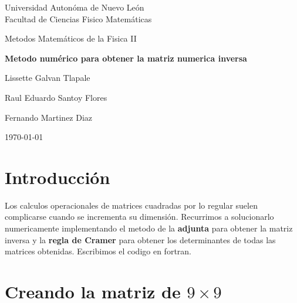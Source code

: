 \documentclass[a4paper]{scrartcl}
\begin{document}
\begin{center}
    \huge{Universidad Autonóma de Nuevo León} \\
    \LARGE{Facultad de Ciencias Fisico Matemáticas}
\end{center}

\vspace{1 cm}
\begin{center}
    \Large{Metodos Matemáticos de la Fisica II}
\end{center}

\vspace{0.5cm}
\begin{center}
    \LARGE\textbf{Metodo numérico para obtener la matriz numerica inversa}\\
\end{center}

\vspace{1.5cm}
\begin{center}
    \large Lissette Galvan Tlapale 
\end{center}
\begin{center}
    \large Raul Eduardo Santoy Flores 
\end{center}
\begin{center}
    \large Fernando Martinez Diaz
\end{center}

\vspace{6cm}
\begin{center}
    \today
\end{center}

\newpage
\section{Introducción}

Los calculos operacionales de matrices cuadradas por lo regular suelen complicarse cuando se incrementa su dimensión. Recurrimos a solucionarlo numericamente implementando el metodo de la \textbf{adjunta} para obtener la matriz inversa y la \textbf{regla de Cramer} para obtener los determinantes de todas las matrices obtenidas. Escribimos el codigo en fortran.

\section{Creando la matriz de $9\times9$}
\end{document}
